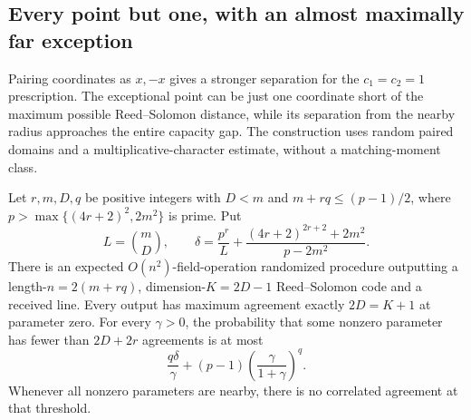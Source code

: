 \subsection{Every point but one, with an almost maximally far exception}
\label{sec:paired-domain}

Pairing coordinates as $x,-x$ gives a stronger separation for the
$c_1=c_2=1$ prescription. The exceptional point can be just one
coordinate short of the maximum possible Reed--Solomon distance,
while its separation from the nearby radius approaches the entire
capacity gap. The construction uses random paired domains and a
multiplicative-character estimate, without a matching-moment class.

\begin{lemma}
\label{pd:sampling}
Let $r,m,D,q$ be positive integers with $D<m$ and
$m+rq\le(p-1)/2$, where $p>\max\{(4r+2)^2,2m^2\}$ is prime. Put
\[
 L=\binom mD,\qquad
 \delta=\frac{p^r}{L}+
 \frac{(4r+2)^{2r+2}+2m^2}{p-2m^2}.
\]
There is an expected $O(n^2)$-field-operation randomized procedure
outputting a length-$n=2(m+rq)$, dimension-$K=2D-1$ Reed--Solomon
code and a received line. Every output has maximum agreement exactly
$2D=K+1$ at parameter zero. For every $\gamma>0$, the probability
that some nonzero parameter has fewer than $2D+2r$ agreements is at most
\begin{equation}\label{pd:failure}
 \frac{q\delta}{\gamma}
 +(p-1)\left(\frac{\gamma}{1+\gamma}\right)^q.
\end{equation}
Whenever all nonzero parameters are nearby, there is no correlated
agreement at that threshold.
\end{lemma}

